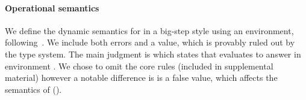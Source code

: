 \paragraph{Operational semantics} We define the dynamic semantics for \lambdatc{}
in a big-step style using an environment, following~\cite{TF10}.
We include both errors and a \wrong{} value, which is provably ruled out by the
type system.
The main judgment is 
which states that \e{} evaluates to answer  in environment
\openv{}. We chose to omit the core rules (included in supplemental material)
however a notable difference is \nil{} is a false value, which affects the
semantics of \ifliteral{} ().


%
%
%

